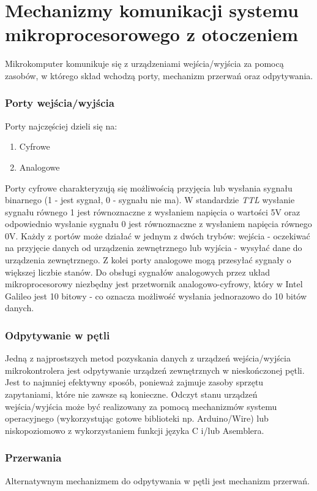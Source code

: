 \documentclass{xmgr}
\begin{document}
\chapter{Mechanizmy komunikacji systemu mikroprocesorowego z otoczeniem}
Mikrokomputer komunikuje się z urządzeniami wejścia/wyjścia za pomocą zasobów, w którego skład wchodzą porty, mechanizm przerwań oraz odpytywania.
\subsection{Porty wejścia/wyjścia}
Porty najczęściej dzieli się na:
\begin{enumerate}
	\item Cyfrowe
	\item Analogowe
\end{enumerate}

Porty cyfrowe charakteryzują się możliwością przyjęcia lub wysłania sygnału binarnego (1 - jest sygnał, 0 - sygnału nie ma). W standardzie \emph{TTL} wysłanie sygnału równego 1 jest równoznaczne z wysłaniem napięcia o wartości 5V oraz odpowiednio wysłanie sygnału 0 jest równoznaczne z wysłaniem napięcia równego 0V. Każdy z portów może działać w jednym  z dwóch trybów: wejścia - oczekiwać na przyjęcie danych od urządzenia zewnętrznego lub wyjścia - wysyłać dane do urządzenia zewnętrznego. Z kolei porty analogowe mogą przesyłać sygnały o większej liczbie stanów. Do obsługi sygnałów analogowych przez układ mikroprocesorowy niezbędny jest przetwornik analogowo-cyfrowy, który w Intel Galileo jest 10 bitowy - co oznacza możliwość wysłania jednorazowo do 10 bitów danych.

\subsection{Odpytywanie w pętli}
Jedną z najprostszych metod pozyskania danych z urządzeń wejścia/wyjścia mikrokontrolera jest odpytywanie urządzeń zewnętrznych w nieskończonej pętli. Jest to najmniej efektywny sposób, ponieważ zajmuje zasoby sprzętu zapytaniami, które nie zawsze są konieczne. Odczyt stanu urządzeń wejścia/wyjścia może być realizowany za pomocą mechanizmów systemu operacyjnego (wykorzystując gotowe biblioteki np. Arduino/Wire) lub niskopoziomowo z wykorzystaniem funkcji języka C i/lub Asemblera.

\subsection{Przerwania}
Alternatywnym mechanizmem do odpytywania w pętli jest mechanizm przerwań. 
\end{document}
